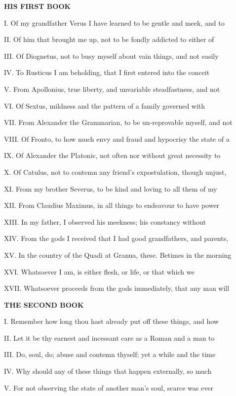 
\textbf{HIS FIRST BOOK}

I. Of my grandfather Verus I have learned to
be gentle and meek, and to

II. Of him that brought me up, not to be
fondly addicted to either of

III. Of Diognetus, not to busy myself about
vain things, and not easily

IV. To Rusticus I am beholding, that I first
entered into the conceit

V. From Apollonius, true liberty, and
unvariable steadfastness, and not

VI. Of Sextus, mildness and the pattern of a
family governed with

VII. From Alexander the Grammarian, to be
un-reprovable myself, and not

VIII. Of Fronto, to how much envy and fraud
and hypocrisy the state of a

IX. Of Alexander the Platonic, not often nor
without great necessity to

X. Of Catulus, not to contemn any friend's
expostulation, though unjust,

XI. From my brother Severus, to be kind and
loving to all them of my

XII. From Claudius Maximus, in all things to
endeavour to have power

XIII. In my father, I observed his meekness;
his constancy without

XIV. From the gods I received that I had good
grandfathers, and parents,

XV. In the country of the Quadi at Granua,
these. Betimes in the morning

XVI. Whatsoever I am, is either flesh, or
life, or that which we

XVII. Whatsoever proceeds from the gods
immediately, that any man will

\textbf{THE SECOND BOOK}

I. Remember how long thou hast already put off
these things, and how

II. Let it be thy earnest and incessant care
as a Roman and a man to

III. Do, soul, do; abuse and contemn thyself;
yet a while and the time

IV. Why should any of these things that happen
externally, so much

V. For not observing the state of another
man's soul, scarce was ever

